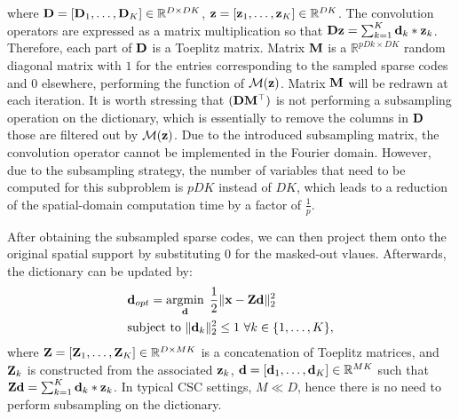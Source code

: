 where $\Filter = [\Filter_1, \dots, \Filter_K] \in \mathbb{R}^{D
  \times DK}$, $\code = [\code_1, \dots, \code_K] \in
\mathbb{R}^{DK}$. The convolution operators are expressed as a matrix
multiplication so that $ \Filter \code = \sum_{k=1}^{K} \filter_k *
\code_k$. Therefore, each part of $\Filter$ is a Toeplitz
matrix. Matrix $\mask$ is a $\mathbb{R}^{pDk \times DK}$ random
diagonal matrix with $1$ for the entries corresponding to the sampled
sparse codes and $0$ elsewhere, performing the function of
$\mathcal{M}(\code)$. Matrix $\mask$ will be redrawn at each
iteration. It is worth stressing that $(\Filter \mask^\top)$ is not
performing a subsampling operation on the dictionary,  which is
essentially to remove the columns in $\Filter$ those are filtered out
by $\mathcal{M}(\code)$.
Due to the introduced subsampling matrix, the
convolution operator cannot be implemented in the Fourier
domain. However, due to the subsampling 
strategy, the number of variables that need to be computed for this
subproblem is $pDK$ instead of $DK$, which leads to a reduction
of the spatial-domain computation time by a factor of $\frac{1}{p}$.

After obtaining the subsampled sparse codes, we can then project them
onto the original spatial support by substituting $0$ for the
masked-out vlaues. Afterwards, the dictionary can be updated by:
\begin{equation} \label{eq:updatingFilter}
\begin{split}
   & \filter_{opt} = \minimize{\filter} \frac{1}{2}\|\signal - \Code \filter \|_2^2 \\
   & \text{subject to}  ~ \|\filter_k\|^2_2 \leq 1 ~ \forall k \in \{1,\dots,K\},
\end{split}
\end{equation}
 where $\Code= [\Code_1, \dots, \Code_K]
\in \mathbb{R}^{D \times MK}$ is a concatenation of Toeplitz matrices,
and $\Code_k$ is constructed from the associated $\code_k$, $\filter=
[\filter_1,\dots,\filter_K] \in \mathbb{R}^{MK}$ such that $ \Code
\filter = \sum_{k=1}^{K} \filter_k * \code_k$. In typical CSC
settings, $M \ll D$, hence there is no need to perform subsampling on
the dictionary.

